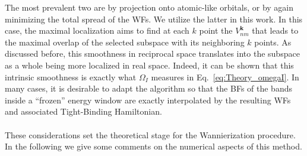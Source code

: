 The most prevalent two are by projection onto atomic-like orbitals, or by again minimizing the total spread of the WFs.
We utilize the latter in this work.
In this case, the maximal localization aims to find at each $k$ point the $V_{nm}^{\bm{k}}$ that leads to the maximal overlap of the selected subspace with its neighboring $k$ points.
As discussed before, this smoothness in reciprocal space translates into the subspace as a whole being more localized in real space.
Indeed, it can be shown \cite{Marzari2012} that this intrinsic smoothness is exactly what $\Omega_I$ measures in Eq.~\eqref{eq:Theory_omegaI}. 
In many cases, it is desirable to adapt the algorithm so that the BFs of the bands inside a ``frozen'' energy window are exactly interpolated by the resulting WFs and associated Tight-Binding Hamiltonian.
\\\\
These considerations set the theoretical stage for the Wannierization procedure. In the following we give some comments on the numerical aspects of this method.

